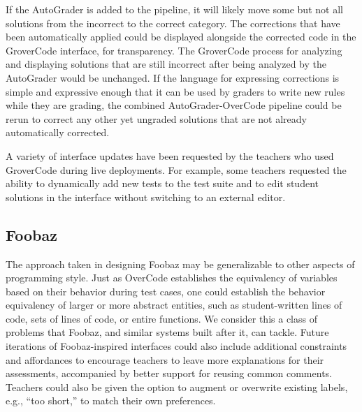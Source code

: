 \documentclass[12pt,twoside]{mitthesis}
\begin{document}
If the AutoGrader is added to the pipeline, it will likely move some but not all solutions from the incorrect to the correct category. The corrections that have been automatically applied could be displayed alongside the corrected code in the GroverCode interface, for transparency. The GroverCode process for analyzing and displaying solutions that are still incorrect after being analyzed by the AutoGrader would be unchanged. If the language for expressing corrections is simple and expressive enough that it can be used by graders to write new rules while they are grading, the combined AutoGrader-OverCode pipeline could be rerun to correct any other yet ungraded solutions that are not already automatically corrected. 

A variety of interface updates have been requested by the teachers who used GroverCode during live deployments. For example, some teachers requested the ability to dynamically add new tests to the test suite and to edit student solutions in the interface without switching to an external editor. %

\subsection{Foobaz}

The approach taken in designing Foobaz may be generalizable to other aspects of programming style. Just as OverCode establishes the equivalency of variables based on their behavior during test cases, one could establish the behavior equivalency of larger or more abstract entities, such as student-written lines of code, sets of lines of code, or entire functions. We consider this a class of problems that Foobaz, and similar systems built after it, can tackle. Future iterations of Foobaz-inspired interfaces could also include additional constraints and affordances to encourage teachers to leave more explanations for their assessments, accompanied by better support for reusing common comments. Teachers could also be given the option to augment or overwrite existing labels, e.g., ``too short,'' to match their own preferences. %
\end{document}
